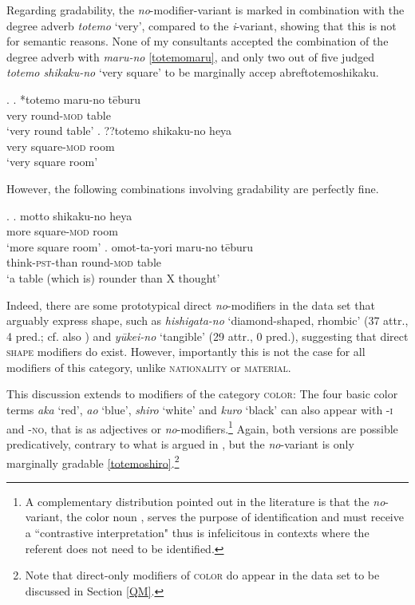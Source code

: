 Regarding gradability, the \textit{no}-modifier-variant is marked in combination with the degree adverb \textit{totemo} `very’, compared to the \textit{i}-variant, showing that this is not for semantic reasons. None of my consultants accepted the combination of the degree adverb with \textit{maru-no} \ref{totemomaru}, and only two out of five judged \textit{totemo shikaku-no} `very square' to be marginally accep	abref{totemoshikaku}.

\ex. \ag. *totemo maru-no tēburu\\
very round-\textsc{mod} table\\
`very round table' \label{totemomaru}
\bg. ??totemo shikaku-no heya\\
very square-\textsc{mod} room\\
`very square room' \label{totemoshikaku}

However, the following combinations involving gradability are perfectly fine.

\ex. \ag. motto shikaku-no heya\\
more square-\textsc{mod} room\\
`more square room’
\bg. omot-ta-yori maru-no tēburu\\
think-\textsc{pst}-than round-\textsc{mod} table\\
`a table (which is) rounder than X thought’

\largerpage
Indeed, there are some prototypical direct \textit{no}-modifiers in the data set that arguably express shape, such as \textit{hishigata-no} `diamond-shaped, rhombic' (37 attr., 4 pred.; cf. also \citealt[98]{morita:2011:three}) and \textit{yūkei-no} `tangible' (29 attr., 0 pred.), suggesting that direct \textsc{shape} modifiers do exist. However, importantly this is not the case for all modifiers of this category, unlike \textsc{nationality} or \textsc{material}.

This discussion extends to modifiers of the category \textsc{color}: The four basic color terms \textit{aka} `red', \textit{ao} `blue', \textit{shiro} `white' and \textit{kuro} `black' can also appear with -\textsc{i} and -\textsc{no}, that is as adjectives or \textit{no}-modifiers.\footnote{A complementary distribution pointed out in the literature \citep{sawada:1992:meishi, kishita:2005:shikisai} is that the \textit{no}-variant, the color noun \citep{okami:2012:two, okami:2016:on}, serves the purpose of identification and must receive a ``contrastive interpretation" \citep{koopman:2016:further} thus is infelicitous in contexts where the referent does not need to be identified.} Again, both versions are possible predicatively, contrary to what is argued in \citet{morita:2011:three}, but the \textit{no}-variant is only marginally gradable \ref{totemoshiro}.\footnote{Note that direct-only modifiers of \textsc{color} do appear in the data set to be discussed in Section \ref{QM}.}

